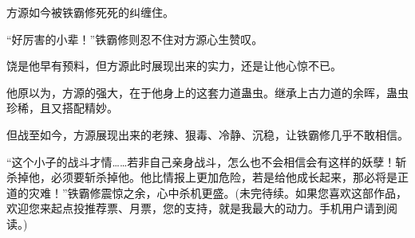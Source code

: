 \begin{this_body}
方源如今被铁霸修死死的纠缠住。

“好厉害的小辈！”铁霸修则忍不住对方源心生赞叹。

饶是他早有预料，但方源此时展现出来的实力，还是让他心惊不已。

他原以为，方源的强大，在于他身上的这套力道蛊虫。继承上古力道的余晖，蛊虫珍稀，且又搭配精妙。

但战至如今，方源展现出来的老辣、狠毒、冷静、沉稳，让铁霸修几乎不敢相信。

“这个小子的战斗才情……若非自己亲身战斗，怎么也不会相信会有这样的妖孽！斩杀掉他，必须要斩杀掉他。他比情报上更加危险，若是给他成长起来，那必将是正道的灾难！”铁霸修震惊之余，心中杀机更盛。(未完待续。如果您喜欢这部作品，欢迎您来起点投推荐票、月票，您的支持，就是我最大的动力。手机用户请到阅读。)

\end{this_body}

